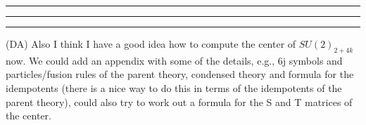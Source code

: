 \documentclass[12pt,a4paper]{article}
\newcounter{arrow}
\newcommand{\kwsep}{\bigskip\hrule\medskip\hrule\medskip\hrule\bigskip}
\newcommand{\dave}[1]{{\color{ao(english)}\footnotesize{(DA) #1}}}
\begin{document}



\kwsep


\dave{Also I think I have a good idea how to compute the center of $SU(2)_{2+4k}$ now. 
We could add an appendix with some of the details, e.g., 6j symbols and particles/fusion rules of the parent theory, condensed theory and formula for the idempotents (there is a nice way to do this in terms of the idempotents of the parent theory), could also try to work out a formula for the S and T matrices of the center.}
\end{document}
